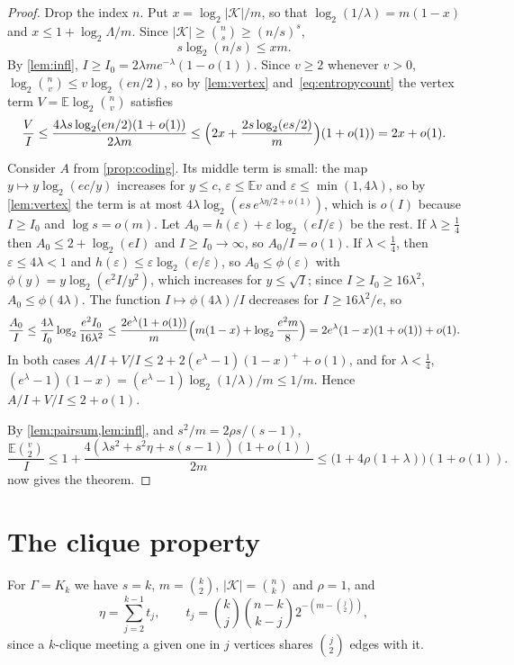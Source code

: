 \documentclass[11pt]{amsart}
\theoremstyle{remark}
\newcommand{\E}{\mathbb{E}}
\newcommand{\eps}{\varepsilon}
\newcommand{\K}{\mathcal K}
\begin{document}
\begin{proof}
Drop the index $n$. Put $x=\log_2|\K|/m$, so that $\log_2(1/\lambda)=m(1-x)$ and $x\le1+\log_2\Lambda/m$. Since
$|\K|\ge\binom ns\ge(n/s)^s$,
\begin{equation}\label{eq:entropycount}
s\log_2(n/s)\le xm.
\end{equation}
By \cref{lem:infl}, $I\ge I_0=2\lambda me^{-\lambda}(1-o(1))$. Since $v\ge2$ whenever $v>0$,
$\log_2\binom nv\le v\log_2(en/2)$, so by \cref{lem:vertex} and~\eqref{eq:entropycount} the vertex term
$V=\E\log_2\binom nv$ satisfies
\[
\frac VI\le\frac{4\lambda s\log_2(en/2)(1+o(1))}{2\lambda m}\le\Bigl(2x+\frac{2s\log_2(es/2)}m\Bigr)(1+o(1))=2x+o(1).
\]

Consider $A$ from \cref{prop:coding}. Its middle term is small: the map $y\mapsto y\log_2(ec/y)$ increases for $y\le c$,
$\eps\le\E v$ and $\eps\le\min(1,4\lambda)$, so by \cref{lem:vertex} the term is at most
$4\lambda\log_2(es\,e^{\lambda\eta/2+o(1)})$, which is $o(I)$ because $I\ge I_0$ and $\log s=o(m)$. Let
$A_0=h(\eps)+\eps\log_2(eI/\eps)$ be the rest. If $\lambda\ge\frac14$ then $A_0\le2+\log_2(eI)$ and
$I\ge I_0\to\infty$, so $A_0/I=o(1)$. If $\lambda<\frac14$, then $\eps\le4\lambda<1$ and $h(\eps)\le\eps\log_2(e/\eps)$,
so $A_0\le\phi(\eps)$ with $\phi(y)=y\log_2(e^2I/y^2)$, which increases for $y\le\sqrt I$; since $I\ge I_0\ge16\lambda^2$,
$A_0\le\phi(4\lambda)$. The function $I\mapsto\phi(4\lambda)/I$ decreases for $I\ge16\lambda^2/e$, so
\[
\frac{A_0}I\le\frac{4\lambda}{I_0}\log_2\frac{e^2I_0}{16\lambda^2}\le\frac{2e^\lambda(1+o(1))}m
\Bigl(m(1-x)+\log_2\frac{e^2m}8\Bigr)=2e^\lambda(1-x)(1+o(1))+o(1).
\]
In both cases $A/I+V/I\le2+2(e^\lambda-1)(1-x)^++o(1)$, and for $\lambda<\frac14$,
$(e^\lambda-1)(1-x)=(e^\lambda-1)\log_2(1/\lambda)/m\le1/m$. Hence $A/I+V/I\le2+o(1)$.

By \cref{lem:pairsum,lem:infl}, and $s^2/m=2\rho s/(s-1)$,
\[
\frac{\E\binom v2}I\le1+\frac{4(\lambda s^2+s^2\eta+s(s-1))(1+o(1))}{2m}\le\bigl(1+4\rho(1+\lambda)\bigr)(1+o(1)).
\]
 now gives the theorem.
\end{proof}

\section{The clique property}\label{sec:clique}

For $\Gamma=K_k$ we have $s=k$, $m=\binom k2$, $|\K|=\binom nk$ and $\rho=1$, and
\[
\eta=\sum_{j=2}^{k-1}t_j,\qquad t_j=\binom kj\binom{n-k}{k-j}2^{-(m-\binom j2)},
\]
since a $k$-clique meeting a given one in $j$ vertices shares $\binom j2$ edges with it.
\end{document}
